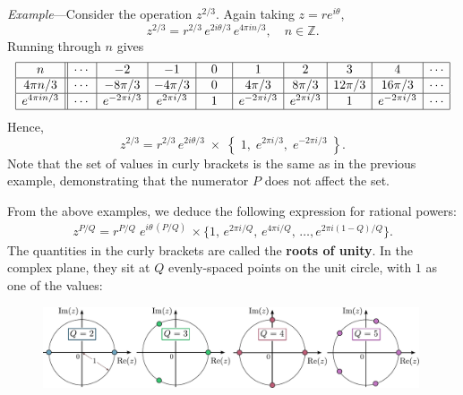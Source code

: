 \documentclass[10pt,a4paper]{article}
\begin{document}

\begin{framed} \noindent
  \textit{Example}---Consider the operation $z^{2/3}$. Again taking
  $z = re^{i\theta}$,
\begin{equation}
  z^{2/3} = r^{2/3} \, e^{2i\theta/3} \, e^{4\pi i n/3}, \quad n \in \mathbb{Z}.
\end{equation}
Running through $n$ gives
\begin{align*}
  \begin{array}{|c||c|c|c|c|c|c|c|c|c|} \hline n &\cdots & -2 & -1 & 0 & 1 & 2 & 3 & 4 & \cdots \\ \hline 4\pi n / 3 &\cdots & -8\pi/3 & -4\pi/3 & 0 & 4\pi/3 & 8\pi/3 & 12\pi/3 & 16\pi/3 & \cdots \\ \hline e^{4\pi i n/3} &\cdots & e^{-2\pi i /3} & e^{2\pi i /3} & \;\,\;1\;\,\; & e^{-2\pi i /3} & e^{2\pi i /3} & \;\,\;1\;\,\; & e^{-2\pi i /3} & \cdots \\ \hline \end{array}
\end{align*}
Hence,
\begin{equation}
z^{2/3} = r^{2/3} \, e^{2i\theta/3} \;\times\; \left\{\;1,\; e^{2\pi i /3},\; e^{-2\pi i /3}\;\right\}.
\end{equation}
Note that the set of values in curly brackets is the same as in the
previous example, demonstrating that the numerator $P$ does not affect
the set.
\end{framed}

\vskip 0.2in

From the above examples, we deduce the following expression for rational powers:
\begin{align}
  z^{P/Q} = r^{P/Q} \; e^{i\theta\, (P/Q)}\, \times \Big\{1,\, e^{2\pi i /Q},\, e^{4\pi i /Q},\, \dots, e^{2\pi i (1-Q)/Q} \Big\}.
\end{align}
The quantities in the curly brackets are called the \textbf{roots of
  unity}. In the complex plane, they sit at $Q$ evenly-spaced points
on the unit circle, with $1$ as one of the values:

\vskip 0.2in
\begin{figure}[ht]
  \centering\includegraphics[width=0.99\textwidth]{roots_of_unity}
\end{figure}
\end{document}
